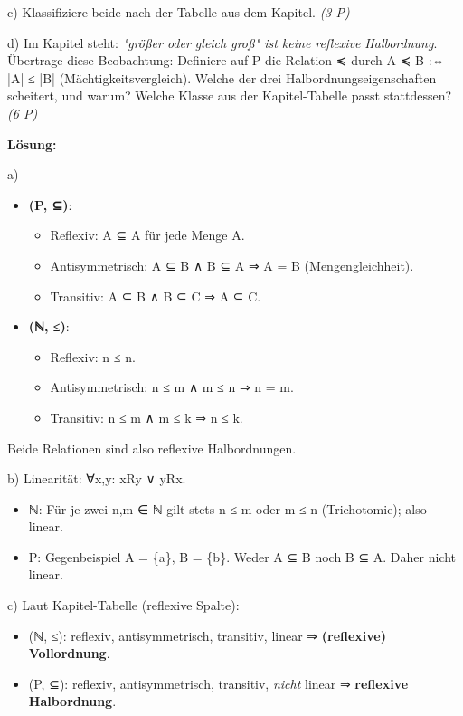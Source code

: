\documentclass[11pt, a4paper]{article}
\begin{document}
c) Klassifiziere beide nach der Tabelle aus dem Kapitel. \textit{(3 P)}

d) Im Kapitel steht: \textit{"größer oder gleich groß" ist keine reflexive Halbordnung}. Übertrage diese Beobachtung: Definiere auf P die Relation ≼ durch A ≼ B :⇔ |A| ≤ |B| (Mächtigkeitsvergleich). Welche der drei Halbordnungseigenschaften scheitert, und warum? Welche Klasse aus der Kapitel-Tabelle passt stattdessen? \textit{(6 P)}


\textbf{Lösung:}


a)

\begin{itemize}
  \item \textbf{(P, ⊆)}:
\begin{itemize}
  \item Reflexiv: A ⊆ A für jede Menge A.
  \item Antisymmetrisch: A ⊆ B ∧ B ⊆ A ⇒ A = B (Mengengleichheit).
  \item Transitiv: A ⊆ B ∧ B ⊆ C ⇒ A ⊆ C.
\end{itemize}
  \item \textbf{(ℕ, ≤)}:
\begin{itemize}
  \item Reflexiv: n ≤ n.
  \item Antisymmetrisch: n ≤ m ∧ m ≤ n ⇒ n = m.
  \item Transitiv: n ≤ m ∧ m ≤ k ⇒ n ≤ k.
\end{itemize}
\end{itemize}

Beide Relationen sind also reflexive Halbordnungen.


b) Linearität: ∀x,y: xRy ∨ yRx.

\begin{itemize}
  \item ℕ: Für je zwei n,m ∈ ℕ gilt stets n ≤ m oder m ≤ n (Trichotomie); also linear.
  \item P: Gegenbeispiel A = \{a\}, B = \{b\}. Weder A ⊆ B noch B ⊆ A. Daher nicht linear.
\end{itemize}

c) Laut Kapitel-Tabelle (reflexive Spalte):

\begin{itemize}
  \item (ℕ, ≤): reflexiv, antisymmetrisch, transitiv, linear ⇒ \textbf{(reflexive) Vollordnung}.
  \item (P, ⊆): reflexiv, antisymmetrisch, transitiv, \textit{nicht} linear ⇒ \textbf{reflexive Halbordnung}.
\end{itemize}
\end{document}
